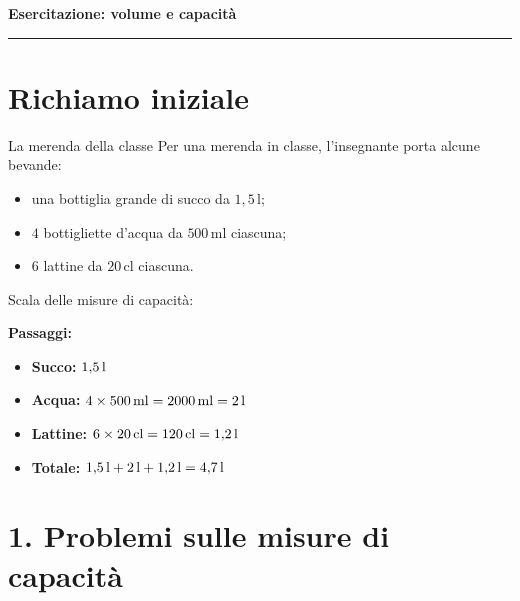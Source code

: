 \begin{center}
  {\Huge \color{mainblue}\textbf{Esercitazione: volume e capacità}}\\[0.2cm]
  \rule{0.82\linewidth}{0.5pt}
\end{center}


\section*{Richiamo iniziale}

\begin{esercizio}{La merenda della classe}
Per una merenda in classe, l'insegnante porta alcune bevande:

\begin{itemize}
  \item una bottiglia grande di succo da $1{,}5\,\mathrm{l}$;
  \item $4$ bottigliette d'acqua da $500\,\mathrm{ml}$ ciascuna;
  \item $6$ lattine da $20\,\mathrm{cl}$ ciascuna.
\end{itemize}


\vspace{0.5cm}

\noindent
Scala delle misure di capacità:

\vspace{0.2cm}


\responsespace{5.8cm}

\begin{soluzione}
  \textbf{Passaggi:}
  \begin{itemize}
    \item \textbf{Succo:} $1{,}5\,\mathrm{l}$
    \item \textbf{Acqua:} $4 \times 500\,\mathrm{ml} = 2000\,\mathrm{ml} = 2\,\mathrm{l}$
    \item \textbf{Lattine:} $6 \times 20\,\mathrm{cl} = 120\,\mathrm{cl} = 1{,}2\,\mathrm{l}$
    \item \textbf{Totale:} $1{,}5\,\mathrm{l} + 2\,\mathrm{l} + 1{,}2\,\mathrm{l} = 4{,}7\,\mathrm{l}$
  \end{itemize}
\end{soluzione}
\end{esercizio}

\condnewpage

\section*{1. Problemi sulle misure di capacità}

